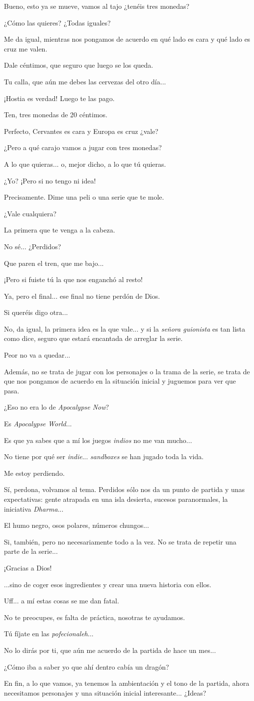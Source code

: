 \documentclass[10pt, a5paper, twocolumn]{article}
\newcommand\E{\item[\raisebox{-0.25em}{\scalebox{0.75}{\bcicosaedre}}]}
\newcommand\B{\item[\raisebox{-0.25em}{\scalebox{0.75}{\bccube}}]}
\newcommand\A{\item[\raisebox{-0.25em}{\scalebox{0.75}{\bctetraedre}}]}
\newenvironment{dialogue}
    {\begin{description}[leftmargin=!,align=right,labelwidth=0.cm]}
    {\end{description}}
\begin{document}
    \begin{dialogue}
        \E Bueno, esto ya se mueve, vamos al tajo ¿tenéis tres monedas?
        \A ¿Cómo las quieres? ¿Todas iguales?
        \E Me da igual, mientras nos pongamos de acuerdo en qué lado es cara y qué lado es cruz me valen.
        \B Dale céntimos, que seguro que luego se los queda.
        \E Tu calla, que aún me debes las cervezas del otro día...
        \B ¡Hostia es verdad! Luego te las pago.
        \A Ten, tres monedas de 20 céntimos.
        \E Perfecto, Cervantes es cara y Europa es cruz ¿vale?
        \B ¿Pero a qué carajo vamos a jugar con tres monedas? 
        \E A lo que quieras... o, mejor dicho, a lo que tú quieras.
        \A ¿Yo? ¡Pero si no tengo ni idea!
        \E Precisamente. Dime una peli o una serie que te mole.
        \A ¿Vale cualquiera?
        \E La primera que te venga a la cabeza.
        \A No sé... ¿Perdidos?
        \B Que paren el tren, que me bajo...
        \E ¡Pero si fuiste tú la que nos enganchó al resto!
        \B Ya, pero el final... ese final no tiene perdón de Dios.
        \A Si queréis digo otra...
        \E No, da igual, la primera idea es la que vale... y si la \emph{señora guionista} es tan lista como dice, seguro que estará encantada de arreglar la serie.
        \B Peor no va a quedar...
        \E Además, no se trata de jugar con los personajes o la trama de la serie, se trata de que nos pongamos de acuerdo en la situación inicial y juguemos para ver que pasa.
        \B ¿Eso no era lo de \emph{Apocalypse Now}?
        \E Es \emph{Apocalypse World}...
        \B Es que ya sabes que a mí los juegos \emph{indios} no me van mucho...
        \E No tiene por qué ser \emph{indie}... \emph{sandboxes} se han jugado toda la vida.
        \A Me estoy perdiendo.
        \E Sí, perdona, volvamos al tema. Perdidos sólo nos da un punto de partida y unas expectativas: gente atrapada en una isla desierta, sucesos paranormales, la iniciativa \emph{Dharma}...
        \A El humo negro, osos polares, números chungos...
        \E Si, también, pero no necesariamente todo a la vez. No se trata de repetir una parte de la serie...
        \B ¡Gracias a Dios!
        \E ...sino de coger esos ingredientes y crear una nueva historia con ellos.
        \A Uff... a mí estas cosas se me dan fatal.
        \E No te preocupes, es falta de práctica, nosotras te ayudamos.
        \B Tú fíjate en las \emph{pofecionaleh}...
        \E No lo dirás por ti, que aún me acuerdo de la partida de hace un mes...
        \B ¿Cómo iba a saber yo que ahí dentro cabía un dragón?
        \E En fin, a lo que vamos, ya tenemos la ambientación y el tono de la partida, ahora necesitamos personajes y una situación inicial interesante... ¿Ideas?

\end{dialogue}
\end{document}
